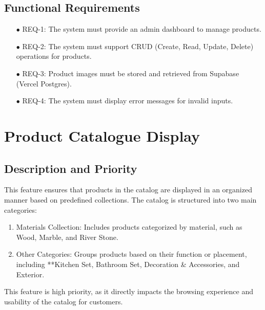 \documentclass[oneside,a4paper,12pt,explicit]{book}
\begin{document}
\subsection{Functional Requirements}
\begin{enumerate}
    \item[$\bullet$] REQ-1: The system must provide an admin dashboard to manage products.
    \item[$\bullet$] REQ-2: The system must support CRUD (Create, Read, Update, Delete) operations for products.
    \item[$\bullet$] REQ-3: Product images must be stored and retrieved from Supabase (Vercel Postgres).
    \item[$\bullet$] REQ-4: The system must display error messages for invalid inputs.
\end{enumerate}

\section{Product Catalogue Display}

\subsection{Description and Priority}
This feature ensures that products in the catalog are displayed in an organized manner based on predefined collections. The catalog is structured into two main categories:
\begin{enumerate}
    \item Materials Collection: Includes products categorized by material, such as Wood, Marble, and River Stone.
    \item Other Categories: Groups products based on their function or placement, including **Kitchen Set, Bathroom Set, Decoration & Accessories, and Exterior.
\end{enumerate}
This feature is high priority, as it directly impacts the browsing experience and usability of the catalog for customers.
\end{document}
